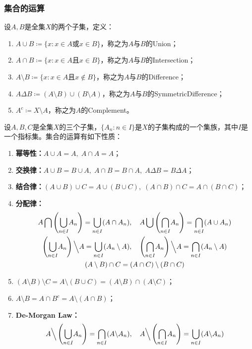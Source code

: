 \subsubsection{集合的运算}
\begin{definition}
	设$A,B$是全集$X$的两个子集，定义：
	\begin{enumerate}
		\item $A\cup B\coloneq\{x:x\in A\text{或}x\in B\}$，称之为$A$与$B$的\gls{Union}；
		\item $A\cap B\coloneq\{x:x\in A\text{且}x\in B\}$，称之为$A$与$B$的\gls{Intersection}；
		\item $A\setminus B\coloneq\{x:x\in A\text{且}x\notin B\}$，称之为$A$与$B$的\gls{Difference}；
		\item $A\Delta B\coloneq (A\setminus B)\cup(B\setminus A)$，称之为$A$与$B$的\gls{SymmetricDifference}；
		\item $A^c\coloneq X\setminus A$，称之为$A$的\gls{Complement}。
	\end{enumerate}
\end{definition}
\begin{property}\label{prop:SetOperation}
	设$A,B,C$是全集$X$的三个子集，$\{A_n:n\in I\}$是$X$的子集构成的一个集族，其中$I$是一个指标集。集合的运算有如下性质：
	\begin{enumerate}
		\item \textbf{幂等性：}$A\cup A=A,\;A\cap A=A$；
		\item \textbf{交换律：}$A\cup B=B\cup A,\;A\cap B=B\cap A,\;A\Delta B=B\Delta A$；
		\item \textbf{结合律：}$(A\cup B)\cup C=A\cup(B\cup C),\;(A\cap B)\cap C=A\cap(B\cap C)$；
		\item \textbf{分配律：}
		\begin{gather*}
			A\bigcap\left(\underset{n\in I}{\overset{}{\bigcup}}A_n\right)=\underset{n\in I}{\overset{}{\bigcup}}(A\cap A_n),\quad A\bigcup\left(\underset{n\in I}{\overset{}{\bigcap}}A_n\right)=\underset{n\in I}{\overset{}{\bigcap}}(A\cup A_n) \\
			\left(\underset{n\in I}{\overset{}{\bigcup}}A_n\right)\Big\backslash A=\underset{n\in I}{\overset{}{\bigcup}}(A_n\setminus A),\quad\left(\underset{n\in I}{\overset{}{\bigcap}}A_n\right)\Big\backslash A=\underset{n\in I}{\overset{}{\bigcap}}(A_n\setminus A) \\
			(A\setminus B)\cap C=(A\cap C)\setminus(B\cap C)
		\end{gather*}
		\item $(A\setminus B)\setminus C=A\setminus(B\cup C)=(A\setminus B)\cap(A\setminus C)$；
		\item $A\setminus B=A\cap B^c=A\setminus (A\cap B)$；
		\item \textbf{De-Morgan Law：}
		\begin{equation*}
			A\Big\backslash\left(\underset{n\in I}{\bigcup}A_n\right)=\underset{n\in I}{\bigcap}(A\backslash A_n),\quad
			A\Big\backslash\left(\underset{n\in I}{\bigcap}A_n\right)=\underset{n\in I}{\bigcup}(A\backslash A_n)
		\end{equation*}
	\end{enumerate}
\end{property}

